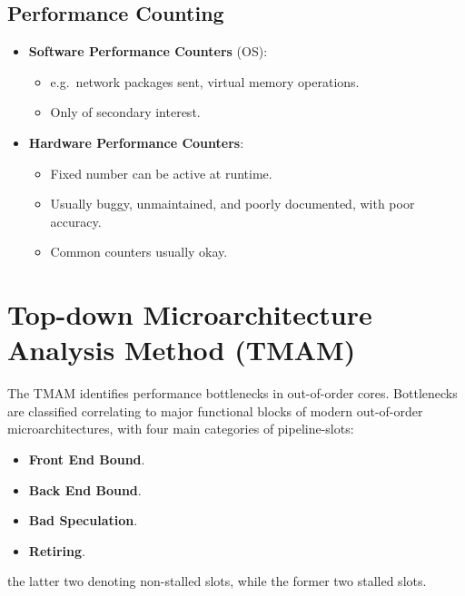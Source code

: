 \documentclass[11pt]{article}
\begin{document}
\subsection{Performance Counting}
\begin{itemize}
  \item \textbf{Software Performance Counters} (OS):
    \begin{itemize}
      \item e.g.\ network packages sent, virtual memory operations.
      \item Only of secondary interest.
    \end{itemize}
  \item \textbf{Hardware Performance Counters}:
    \begin{itemize}
      \item Fixed number can be active at runtime.
      \item Usually buggy, unmaintained, and poorly documented, with poor accuracy.
      \item Common counters usually okay.
    \end{itemize}
\end{itemize}

\section{Top-down Microarchitecture Analysis Method (TMAM)}
The TMAM identifies performance bottlenecks in out-of-order cores.
Bottlenecks are classified correlating to major functional blocks of modern out-of-order microarchitectures, with four main categories of pipeline-slots:
\begin{itemize}
  \item \textbf{Front End Bound}.
  \item \textbf{Back End Bound}.
  \item \textbf{Bad Speculation}.
  \item \textbf{Retiring}.
\end{itemize}
the latter two denoting non-stalled slots, while the former two stalled slots.
\end{document}
